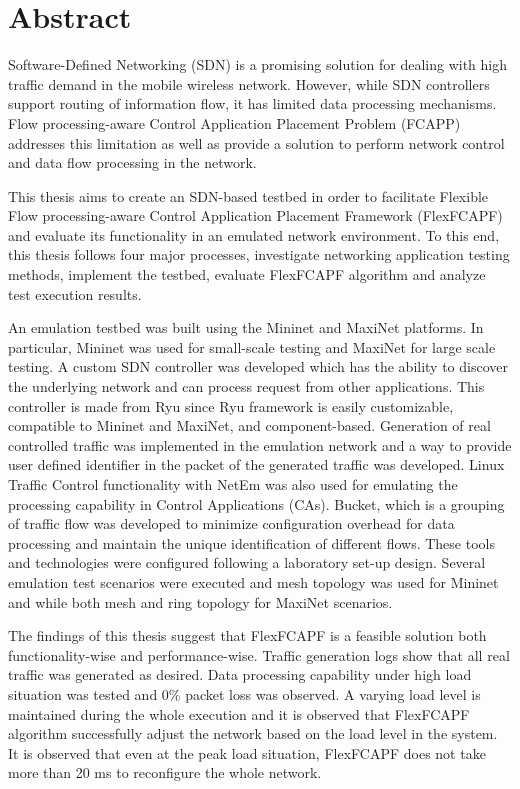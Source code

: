 \newpage
\thispagestyle{empty}
\mbox{}


\chapter*{Abstract}
Software-Defined Networking (SDN) is a promising solution for dealing with high traffic demand in the mobile wireless network. However, while SDN controllers support routing of information flow, it has limited data processing mechanisms. Flow processing-aware Control Application Placement Problem (FCAPP) addresses this limitation as well as provide a solution to perform network control and data flow processing in the network.

This thesis aims to create an SDN-based testbed in order to facilitate Flexible Flow processing-aware Control Application Placement Framework (FlexFCAPF) and evaluate its functionality in an emulated network environment. To this end,  this thesis follows four major processes, investigate networking application testing methods, implement the testbed, evaluate FlexFCAPF algorithm and analyze test execution results.

An emulation testbed was built using the Mininet and MaxiNet platforms. In particular, Mininet was used for small-scale testing and MaxiNet for large scale testing. A custom SDN controller was developed which has the ability to discover the underlying network and can process request from other applications. This controller is made from Ryu since Ryu framework is easily customizable, compatible to Mininet and MaxiNet, and component-based. Generation of real controlled traffic was implemented in the emulation network and a way to provide user defined identifier in the packet of the generated traffic was developed. Linux Traffic Control functionality with NetEm was also used for emulating the processing capability in Control Applications (CAs). Bucket, which is a grouping of traffic flow was developed to minimize configuration overhead for data processing and maintain the unique identification of different flows. These tools and technologies were configured following a laboratory set-up design. Several emulation test scenarios were executed and mesh topology was used for Mininet and while both mesh and ring topology for MaxiNet scenarios.

The findings of this thesis suggest that FlexFCAPF is a feasible solution both functionality-wise and performance-wise. Traffic generation logs show that all real traffic was generated as desired.  Data processing capability under high load situation was tested and 0\% packet loss was observed. A varying load level is maintained during the whole execution and it is observed that FlexFCAPF algorithm successfully adjust the network based on the load level in the system. It is observed that even at the peak load situation, FlexFCAPF does not take more than 20 ms to reconfigure the whole network.
